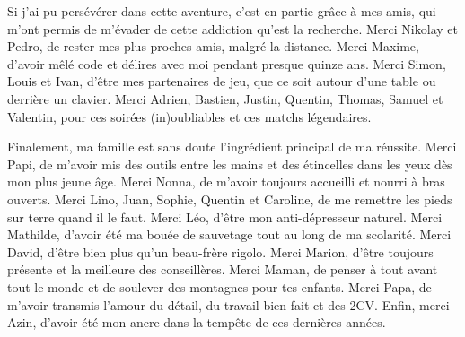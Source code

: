 Si j'ai pu persévérer dans cette aventure, c'est en partie grâce à mes amis, qui m'ont permis de m'évader de cette addiction qu'est la recherche. Merci Nikolay et Pedro, de rester mes plus proches amis, malgré la distance. Merci Maxime, d'avoir mêlé code et délires avec moi pendant presque quinze ans. Merci Simon, Louis et Ivan, d'être mes partenaires de jeu, que ce soit autour d'une table ou derrière un clavier. Merci Adrien, Bastien, Justin, Quentin, Thomas, Samuel et Valentin, pour ces soirées (in)oubliables et ces matchs légendaires.

Finalement, ma famille est sans doute l'ingrédient principal de ma réussite. Merci Papi, de m'avoir mis des outils entre les mains et des étincelles dans les yeux dès mon plus jeune âge. Merci Nonna, de m'avoir toujours accueilli et nourri à bras ouverts. Merci Lino, Juan, Sophie, Quentin et Caroline, de me remettre les pieds sur terre quand il le faut. Merci Léo, d'être mon anti-dépresseur naturel. Merci Mathilde, d'avoir été ma bouée de sauvetage tout au long de ma scolarité. Merci David, d'être bien plus qu'un beau-frère rigolo. Merci Marion, d'être toujours présente et la meilleure des conseillères. Merci Maman, de penser à tout avant tout le monde et de soulever des montagnes pour tes enfants. Merci Papa, de m'avoir transmis l'amour du détail, du travail bien fait et des 2CV. Enfin, merci Azin, d'avoir été mon ancre dans la tempête de ces dernières années.
